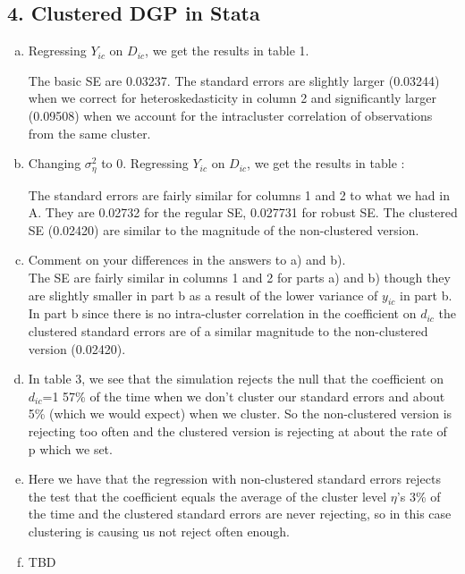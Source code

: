 \documentclass[11pt]{article}
\begin{document}
\subsection*{4. Clustered DGP in Stata}

\begin{enumerate}[a)]

	\item Regressing $Y_{ic}$ on $D_{ic}$, we get the results in table 1.
		 

	The basic SE are 0.03237. The standard errors are slightly larger (0.03244) when we correct for heteroskedasticity in column 2 and significantly larger (0.09508) when we account for the intracluster correlation of observations from the same cluster.

	\item Changing $\sigma^2_{\eta}$ to 0. Regressing $Y_{ic}$ on $D_{ic}$, we get the results in table :
		

	The standard errors are fairly similar for columns 1 and 2 to what we had in A. They are 0.02732 for the regular SE, 0.027731 for robust SE.  The clustered SE (0.02420) are similar to the magnitude of the non-clustered version.

	\item  Comment on your differences in the answers to a) and b). \\
The SE are fairly similar in columns 1 and 2 for parts a) and b) though they are slightly smaller in part b as a result of the lower variance of $y_{ic}$ in part b. In part b since there is no intra-cluster correlation in the coefficient on $d_{ic}$ the clustered standard errors are of a similar magnitude to the non-clustered version (0.02420). 

	\item In table 3, we see that the simulation rejects the null that the coefficient on $d_{ic}$=1 57\% of the time when we don't cluster our standard errors and about 5\% (which we would expect) when we cluster. So the non-clustered version is rejecting too often and the clustered version is rejecting at about the rate of p which we set.
		

	\item Here we have that the regression with non-clustered standard errors rejects the test that the coefficient equals the average of the cluster level $\eta$'s 3\% of the time and the clustered standard errors are never rejecting, so in this case clustering is causing us not reject often enough. \\
		

	\item TBD
\end{enumerate}
\end{document}
